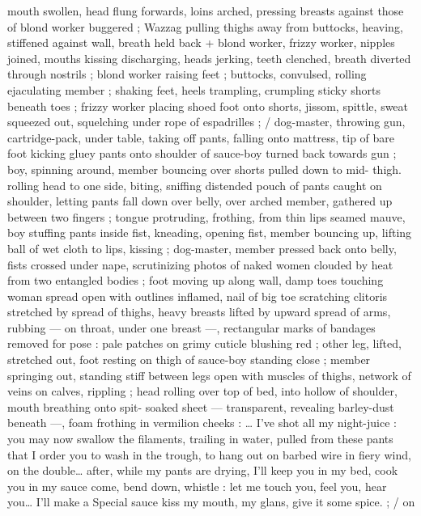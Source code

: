{mouth swollen, head flung forwards, loins arched, pressing breasts 
against those of blond worker buggered ; Wazzag pulling thighs 
away from buttocks, heaving, stiffened against wall, breath held back 
+ blond worker, frizzy worker, nipples joined, mouths kissing 
discharging, heads jerking, teeth clenched, breath diverted through 
nostrils ; blond worker raising feet ; buttocks, convulsed, rolling 
ejaculating member ; shaking feet, heels trampling, crumpling sticky 
shorts beneath toes ; frizzy worker placing shoed foot onto shorts, 
jissom, spittle, sweat squeezed out, squelching under rope of 
espadrilles ; {\slash} dog-master, throwing gun, cartridge-pack, under table, 
taking off pants, falling onto mattress, tip of bare foot kicking gluey 
pants onto shoulder of sauce-boy turned back towards gun ; boy, 
spinning around, member bouncing over shorts pulled down to mid- 
thigh. rolling head to one side, biting, sniffing distended pouch of 
pants caught on shoulder, letting pants fall down over belly, over 
arched member, gathered up between two fingers ; tongue 
protruding, frothing, from thin lips seamed mauve, boy stuffing pants 
inside fist, kneading, opening fist, member bouncing up, lifting ball 
of wet cloth to lips, kissing ; dog-master, member pressed back onto 
belly, fists crossed under nape, scrutinizing photos of naked women 
clouded by heat from two entangled bodies ; foot moving up along 
wall, damp toes touching woman spread open with outlines inflamed, 
nail of big toe scratching clitoris stretched by spread of thighs, 
heavy breasts lifted by upward spread of arms, rubbing --- on throat, 
under one breast ---, rectangular marks of bandages removed for 
pose : pale patches on grimy cuticle blushing red ; other leg, lifted, 
stretched out, foot resting on thigh of sauce-boy standing close ; 
member springing out, standing stiff between legs open with 
muscles of thighs, network of veins on calves, rippling ; head rolling 
over top of bed, into hollow of shoulder, mouth breathing onto spit- 
soaked sheet --- transparent, revealing barley-dust beneath ---, 
foam frothing in vermilion cheeks : {\td} {\gl} {\ldots} I've shot all my night-juice 
: you may now swallow the filaments, trailing in water, pulled from 
these pants that I order you to wash in the trough, to hang out on 
barbed wire in fiery wind, on the double{\ldots} after, while my pants are 
drying, I'll keep you in my bed, cook you in my sauce{\td} come, bend 
down, whistle : let me touch you, feel you, hear you{\ldots} I'll make a 
Special sauce{\td} kiss my mouth, my glans, give it some spice.{\gr} ; {\slash} on 
}
